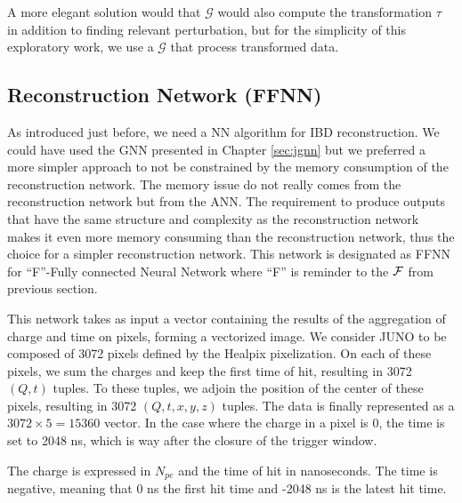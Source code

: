 \documentclass[../main.tex]{subfiles}
\begin{document}
A more elegant solution would that $\mathcal{G}$ would also compute the transformation $\tau$ in addition to finding relevant perturbation, but for the simplicity of this exploratory work, we use a $\mathcal{G}$ that process transformed data.

\subsection{Reconstruction Network (FFNN)}
\label{sec:janne:arch:reco}

As introduced just before, we need a NN algorithm for IBD reconstruction. We could have used the GNN presented in Chapter \ref{sec:jgnn} but we preferred a more simpler approach to not be constrained by the memory consumption of the reconstruction network. The memory issue do not really comes from the reconstruction network but from the ANN. The requirement to produce outputs that have the same structure and complexity as the reconstruction network makes it even more memory consuming than the reconstruction network, thus the choice for a simpler reconstruction network. This network is designated as FFNN for ``F''-Fully connected Neural Network where ``F'' is reminder to the ${\cal F}$ from previous section.

This network takes as input a vector containing the results of the aggregation of charge and time on pixels, forming a vectorized image. We consider JUNO to be composed of 3072 pixels defined by the Healpix \cite{gorski_healpix_2005} pixelization. On each of these pixels, we sum the charges and keep the first time of hit, resulting in 3072 $(Q,t)$ tuples. To these tuples, we adjoin the position of the center of these pixels, resulting in 3072 $(Q,t,x,y,z)$ tuples. The data is finally represented as a $3072 \times 5 = 15360$ vector. In the case where the charge in a pixel is 0, the time is set to 2048 ns, which is way after the closure of the trigger window.

The charge is expressed in $N_{pe}$ and the time of hit in nanoseconds. The time is negative, meaning that 0 ns the first hit time and -2048 ns is the latest hit time.
\end{document}
